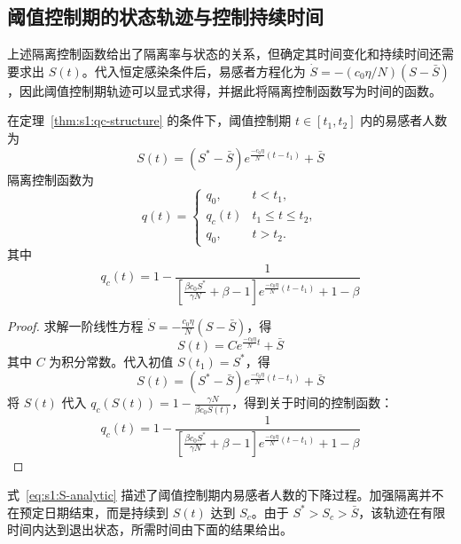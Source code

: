 \documentclass[lang=cn,a4paper,newtx]{elegantpaper}
\numberwithin{equation}{section}
\theoremstyle{plain}
\begin{document}
\subsection{阈值控制期的状态轨迹与控制持续时间}
上述隔离控制函数给出了隔离率与状态的关系，但确定其时间变化和持续时间还需要求出 $S(t)$。代入恒定感染条件后，易感者方程化为 $\dot S=-(c_0\eta/N)(S-\bar S)$，因此阈值控制期轨迹可以显式求得，并据此将隔离控制函数写为时间的函数。
\begin{theorem}
    在定理~\ref{thm:s1:qc-structure} 的条件下，阈值控制期 $t\in[t_1,t_2]$ 内的易感者人数为
    \begin{equation}
        S(t) = \left( S^* - \bar S \right) e^{\frac{-c_0\eta}{N}(t - t_1 )} + \bar S
        \label{eq:s1:S-analytic}
    \end{equation}
    隔离控制函数为
    \begin{equation*}
    q(t) =
    \begin{cases}
    q_0, & t < t_1, \\
    q_c(t) & t_1 \le t \le t_2, \\
    q_0, & t > t_2.       
    \end{cases}
    \end{equation*}
    其中
    \begin{equation}
        q_c(t)= 1 - \frac{1}{\left[\frac{\beta c_0 S^* }{\gamma N} + \beta- 1 \right] e^{\frac{-c_0 \eta}{N} (t-t_1)} + 1-\beta} 
    \end{equation}
\end{theorem}
\begin{proof}
    求解一阶线性方程 $\dot{S}=-\frac{c_0\eta}{N}(S-\bar S)$，得
    \[
        S(t) = C e^{\frac{-c_0 \eta}{N} t} + \bar S
    \]
    其中 $C$ 为积分常数。代入初值 $S(t_1)=S^*$，得
    \[
    S(t) = \left( S^* - \bar S \right) e^{\frac{-c_0\eta}{N}(t - t_1 )} + \bar S
    \]
    将 $S(t)$ 代入 $q_c(S(t))=1-\frac{\gamma N}{\beta c_0 S(t)}$，得到关于时间的控制函数：
    \[
    q_c(t)= 1 - \frac{1}{\left[\frac{\beta c_0 S^* }{\gamma N} + \beta- 1 \right] e^{\frac{-c_0 \eta}{N} (t-t_1)} + 1-\beta}
    \]
\end{proof}
式~\eqref{eq:s1:S-analytic} 描述了阈值控制期内易感者人数的下降过程。加强隔离并不在预定日期结束，而是持续到 $S(t)$ 达到 $S_c$。由于 $S^*>S_c>\bar S$，该轨迹在有限时间内达到退出状态，所需时间由下面的结果给出。
\end{document}
